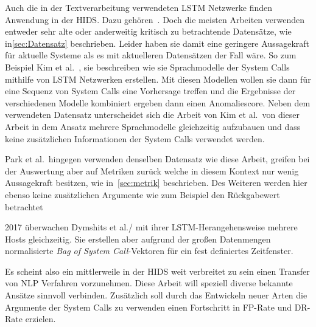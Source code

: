         Auch die in der Textverarbeitung verwendeten \ac{LSTM} Netzwerke finden Anwendung in der \ac{HIDS}.
        Dazu gehören~\cite{LSTMsys, LSTMPARK2021, LSTMSURATKAR2019, NIU2020, BIDIRECTIONALLSTMCHAWLA2019, VARIATIONALLSTMBOUZAR2019}.
        Doch die meisten Arbeiten verwenden entweder sehr alte oder anderweitig kritisch zu betrachtende Datensätze, wie in\autoref{sec:Datensatz} beschrieben.
        Leider haben sie damit eine geringere Aussagekraft für aktuelle Systeme als es mit aktuelleren Datensätzen der Fall wäre.
        So zum Beispiel Kim et al.~\cite{LSTMsys}, sie beschreiben wie sie Sprachmodelle der System Calls mithilfe von \ac{LSTM} Netzwerken erstellen.
        Mit diesen Modellen wollen sie dann für eine Sequenz von System Calls eine Vorhersage treffen und die Ergebnisse der verschiedenen Modelle kombiniert ergeben dann einen Anomaliescore.
        Neben dem verwendeten Datensatz unterscheidet sich die Arbeit von Kim et al.\ von dieser Arbeit in dem Ansatz mehrere Sprachmodelle gleichzeitig aufzubauen und dass keine zusätzlichen Informationen der System Calls verwendet werden.

        Park et al.\ hingegen verwenden denselben Datensatz wie diese Arbeit, greifen bei der Auswertung aber auf Metriken zurück welche in diesem Kontext nur wenig Aussagekraft besitzen, wie in~\autoref{sec:metrik} beschrieben.
        Des Weiteren werden hier ebenso keine zusätzlichen Argumente wie zum Beispiel den Rückgabewert betrachtet~\cite{LSTMPARK2021}

        2017 überwachen Dymshits et al./ mit ihrer LSTM-Herangehensweise mehrere Hosts gleichzeitig.
        Sie erstellen aber aufgrund der großen Datenmengen normalisierte \textit{Bag of System Call}-Vektoren für ein fest definiertes Zeitfenster.~\cite{LSTMDYMSHITS2017}

        Es scheint also ein mittlerweile in der \ac{HIDS} weit verbreitet zu sein einen Transfer von \ac{NLP} Verfahren vorzunehmen.
        Diese Arbeit will speziell diverse bekannte Ansätze sinnvoll verbinden.
        Zusätzlich soll durch das Entwickeln neuer Arten die Argumente der System Calls zu verwenden einen Fortschritt in \ac{FP}-Rate und \ac{DR}-Rate erzielen.





